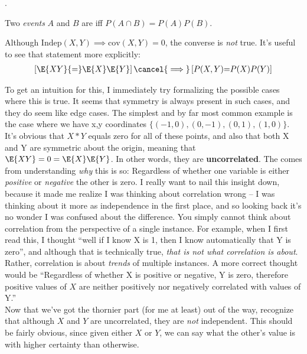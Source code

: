 \documentclass[11pt]{article}
\newcommand\myspace[1][]{\vspace{#1\bigskipamount}}
\newcommand\p{\Needspace{10\baselineskip} \noindent}
\begin{document}
\myspace
\p {}. 
\begin{compactitem}
	\item Two \textit{events} $A$ and $B$ are  iff $P(A \cap B) = P(A)P(B)$.
	
	\item Although $\text{Indep}(X, Y) \implies \text{cov}(X, Y){=}0$, the converse is \textit{not} true. It's useful to see that statement more explicitly:
	\begin{align}
		\left[ \E{XY} {=} \E{X}\E{Y}  \right]
		\cancel{\implies}
		\left[  P(X, Y) {=} P(X)P(Y) \right] 
	\end{align}
	\begin{example}
		To get an intuition for this, I immediately try formalizing the possible cases where this is true. It seems that symmetry is always present in such cases, and they do seem like edge cases. The simplest and by far most common example is the case where we have x,y coordinates $\{(-1, 0), (0, -1), (0, 1), (1, 0)\}$. \\

		It's obvious that $X * Y$ equals zero for all of these points, and also that both X and Y are symmetric about the origin, meaning that $\E{XY}=0=\E{X}\E{Y}$. In other words, they are \textbf{uncorrelated}. The  comes from understanding \textit{why} this is so: Regardless of whether one variable is either \textit{positive} or \textit{negative} the other is zero. I really want to nail this insight down, because it made me realize I was thinking about correlation wrong -- I was thinking about it more as independence in the first place, and so looking back it's no wonder I was confused about the difference. You simply cannot think about correlation from the perspective of a single instance. For example, when I first read this, I thought ``well if I know X is 1, then I know automatically that Y is zero'', and although that is technically true, \textit{that is not what correlation is about}. Rather, correlation is about \textit{trends} of multiple instances. A more correct thought would be ``Regardless of whether X is positive or negative, Y is zero, therefore positive values of $X$ are neither positively nor negatively correlated with values of Y.''\\
		
		Now that we've got the thornier part (for me at least) out of the way, recognize that although $X$ and $Y$ are uncorrelated, they are \textit{not} independent. This should be fairly obvious, since given either $X$ or $Y$, we can say what the other's value is with higher certainty than otherwise. 
	\end{example}
\end{compactitem}
\end{document}
